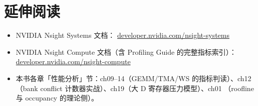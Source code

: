 \section*{延伸阅读}
\begin{itemize}
\item NVIDIA Nsight Systems 文档：
  \href{https://developer.nvidia.com/nsight-systems}{developer.nvidia.com/nsight-systems}
\item NVIDIA Nsight Compute 文档（含 Profiling Guide 的完整指标索引）：
  \href{https://developer.nvidia.com/nsight-compute}{developer.nvidia.com/nsight-compute}
\item 本书各章「性能分析」节：ch09--14（GEMM/TMA/WS 的指标判读）、ch12
  （bank conflict 计数器实战）、ch19（大 D 寄存器压力模型）、ch01
  （roofline 与 occupancy 的理论侧）。
\end{itemize}
